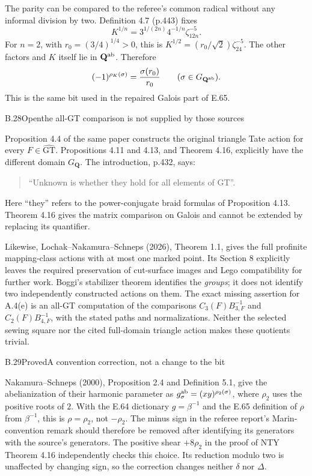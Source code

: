 The parity can be compared to the referee's common radical without
any informal division by two. Definition 4.7 (p.443) fixes
\[
 K^{1/n}=3^{1/(2n)}4^{-1/n}\zeta_{12n}^{-5}.
\]
For $n=2$, with $r_0=(3/4)^{1/4}>0$, this is
$K^{1/2}=(r_0/\sqrt2)\zeta_{24}^{-5}$. The other factors and
$K$ itself lie in $\mathbf Q^{\rm ab}$. Therefore
\[
 (-1)^{\rho_K(\sigma)}=\frac{\sigma(r_0)}{r_0}
       \qquad(\sigma\in G_{\mathbf Q^{\rm ab}}).
\]
This is the same bit used in the repaired Galois part of E.65.

\begin{statement}{B.28}{Open}{the all-GT comparison is not supplied by those sources}
\citep{LitLochakNakamuraSchneps2026,LitNakamuraTsunogaiYasuda2010}
\end{statement}
Proposition 4.4 of the same paper constructs the original triangle
Tate action for every $F\in\widehat{\mathrm{GT}}$. Propositions
4.11 and 4.13, and Theorem 4.16, explicitly have the different
domain $G_{\mathbf Q}$. The introduction, p.432, says:
\begin{quote}
``Unknown is whether they hold for all elements of GT''.
\end{quote}
Here ``they'' refers to the power-conjugate braid formulas of
Proposition 4.13. Theorem 4.16 gives the matrix comparison on
Galois and cannot be extended by replacing its quantifier.

Likewise, Lochak--Nakamura--Schneps (2026), Theorem 1.1, gives
the full profinite mapping-class actions with at most one marked
point. Its Section 8 explicitly leaves the required preservation
of cut-surface images and Lego compatibility for further work.
Boggi's stabilizer theorem identifies the \emph{groups}; it does
not identify two independently constructed actions on them.
The exact missing assertion for A.4(e) is an all-GT computation
of the comparisons $C_3(F)B_{3,F}^{-1}$ and
$C_2(F)B_{4,F}^{-1}$, with the stated paths and normalizations.
Neither the selected sewing square nor the cited full-domain
triangle action makes these quotients trivial.

\begin{statement}{B.29}{Proved}{A convention correction, not a change to the bit}
\citep[Proposition 2.4 and Definition 5.1]{LitNakamuraSchneps2000}
\end{statement}
Nakamura--Schneps (2000), Proposition 2.4 and Definition 5.1,
give the abelianization of their harmonic parameter as
$g_\sigma^{\rm ab}=(xy)^{\rho_2(\sigma)}$, where $\rho_2$
uses the positive roots of $2$. With the E.64 dictionary
$g=\beta^{-1}$ and the E.65 definition of $\rho$ from
$\beta^{-1}$, this is $\rho=\rho_2$, not $-\rho_2$.
The minus sign in the referee report's Marin-convention remark
should therefore be removed after identifying its generators
with the source's generators. The positive shear $+8\rho_2$
in the proof of NTY Theorem 4.16 independently checks this
choice. Its reduction modulo two is unaffected by changing
sign, so the correction changes neither $\delta$ nor $\Delta$.


